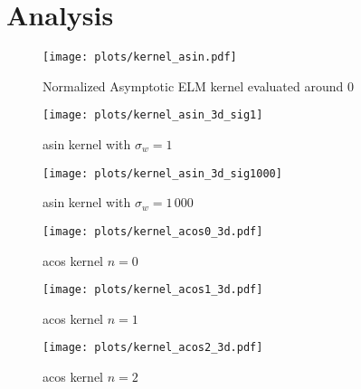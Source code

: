 \chapter{Analysis}
\label{sec:analysis}

\begin{figure}
    \texttt{[image: plots/kernel\_asin.pdf]}
    \caption{Normalized Asymptotic ELM kernel evaluated around 0}
\end{figure}

\begin{figure}
    \texttt{[image: plots/kernel\_asin\_3d\_sig1]}
    \caption{asin kernel with $\sigma_w=1$}
\end{figure}

\begin{figure}
    \texttt{[image: plots/kernel\_asin\_3d\_sig1000]}
    \caption{asin kernel with $\sigma_w=1\,000$}
\end{figure}


\begin{figure}
    \texttt{[image: plots/kernel\_acos0\_3d.pdf]}
    \caption{acos kernel $n=0$}
\end{figure}

\begin{figure}
    \texttt{[image: plots/kernel\_acos1\_3d.pdf]}
    \caption{acos kernel $n=1$}
\end{figure}

\begin{figure}
    \texttt{[image: plots/kernel\_acos2\_3d.pdf]}
    \caption{acos kernel $n=2$}
\end{figure}

